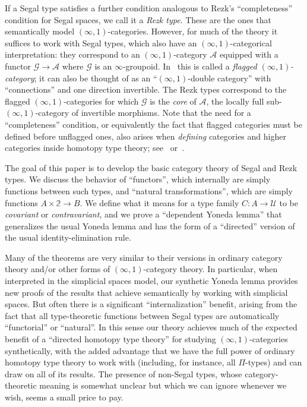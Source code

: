 \documentclass[12pt]{amsart}
\theoremstyle{plain}
\theoremstyle{definition}
\theoremstyle{remark}
\numberwithin{equation}{section}
\newcommand{\univtype}{\mathcal{U}}
\newcommand{\two}{\mathbb{2}}
\begin{document}
If a Segal type satisfies a further condition analogous to Rezk's ``completeness'' condition for Segal spaces, we call it a \emph{Rezk type}.
These are the ones that semantically model $(\infty,1)$-categories.
However, for much of the theory it suffices to work with Segal types, which also have an $(\infty,1)$-categorical interpretation: they correspond to an $(\infty,1)$-category $\mathcal{A}$ equipped with a functor $\mathcal{G}\to \mathcal{A}$ where $\mathcal{G}$ is an $\infty$-groupoid.
In~\cite{fibrations} this is called a \emph{flagged $(\infty,1)$-category}; it can also be thought of as an ``$(\infty,1)$-double category'' with ``connections'' and one direction invertible.
The Rezk types correspond to the flagged $(\infty,1)$-categories for which $\mathcal{G}$ is the \emph{core} of $\mathcal{A}$, the locally full sub-$(\infty,1)$-category of invertible morphisms.
Note that the need for a ``completeness'' condition, or equivalently the fact that flagged categories must be defined before unflagged ones, also arises when \emph{defining} categories and higher categories inside homotopy type theory; see~\cite[Chapter 9]{hottbook} or~\cite{aks}.

The goal of this paper is to develop the basic category theory of Segal and Rezk types.
We discuss the behavior of ``functors'', which internally are simply functions between such types, and ``natural transformations'', which are simply functions $A\times \two\to B$.
We define what it means for a type family $C:A\to \univtype$ to be \emph{covariant} or \emph{contravariant}, and we prove a ``dependent Yoneda lemma'' that generalizes the usual Yoneda lemma and has the form of a ``directed'' version of the usual identity-elimination rule.

Many of the theorems are very similar to their versions in ordinary category theory and/or other forms of $(\infty,1)$-category theory.
In particular, when interpreted in the simplicial spaces model, our synthetic Yoneda lemma provides new proofs of the results that \cite{RV4,kv:yoneda-css,boavida:segr,rasekh:yoneda-ss} achieve semantically by working with simplicial spaces.
But often there is a significant ``internalization'' benefit, arising from the fact that all type-theoretic functions between Segal types are automatically ``functorial'' or ``natural''.
In this sense our theory achieves much of the expected benefit of a ``directed homotopy type theory'' for studying $(\infty,1)$-categories synthetically, with the added advantage that we have the full power of ordinary homotopy type theory to work with (including, for instance, all $\Pi$-types) and can draw on all of its results.
The presence of non-Segal types, whose category-theoretic meaning is somewhat unclear but which we can ignore whenever we wish, seems a small price to pay.
\end{document}
